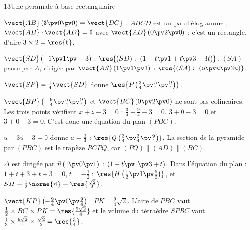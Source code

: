 \begin{corrige}{13}{Une pyramide à base rectangulaire}
\begin{questions}
  \item $\vect{AB}\,(3\pv0\pv0)=\vect{DC}$ : $ABCD$ est un parallélogramme ; $\vect{AB}\cdot\vect{AD}=0$ avec $\vect{AD}\,(0\pv2\pv0)$ : c'est un
    rectangle, d'aire $3\times2=\res{6}$.
  \item $\vect{SD}\,(-1\pv1\pv-3)$ : $\res{(SD):\ (1-t\pv1+t\pv3-3t)}$. $(SA)$ passe par $A$, dirigée par $\vect{AS}\,(1\pv1\pv3)$ :
    $\res{(SA):\ (u\pv u\pv3u)}$.
  \item $\vect{SP}=\frac14\vect{SD}$ donne $\res{P\left(\tfrac34\pv\tfrac54\pv\tfrac94\right)}$.
  \item $\vect{BP}\left(-\frac94\pv\frac54\pv\frac94\right)$ et $\vect{BC}\,(0\pv2\pv0)$ ne sont pas colinéaires. Les trois points vérifient
    $x+z-3=0$ : $\frac34+\frac94-3=0$, $3+0-3=0$ et $3+0-3=0$. C'est donc une équation du plan $(PBC)$.
  \item $u+3u-3=0$ donne $u=\frac34$ : $\res{Q\left(\tfrac34\pv\tfrac34\pv\tfrac94\right)}$. La section de la pyramide par $(PBC)$
    est le trapèze $BCPQ$, car $(PQ)\parallel(AD)\parallel(BC)$.
  \item $\Delta$ est dirigée par $\vec n\,(1\pv0\pv1)$ : $(1+t\pv1\pv3+t)$. Dans l'équation du plan : $1+t+3+t-3=0$, $t=-\frac12$ :
    $\res{H\left(\tfrac12\pv1\pv\tfrac52\right)}$, et $SH=\frac12\norme{\vec n}=\res{\tfrac{\sqrt2}{2}}$.
  \item $\vect{KP}\left(-\frac94\pv0\pv\frac94\right)$ : $PK=\frac94\sqrt2$. L'aire de $PBC$ vaut $\frac12\times BC\times PK=\res{\tfrac{9\sqrt2}{4}}$
    et le volume du tétraèdre $SPBC$ vaut $\frac13\times\frac{9\sqrt2}{4}\times\frac{\sqrt2}{2}=\res{\tfrac34}$.
\end{questions}
\end{corrige}

